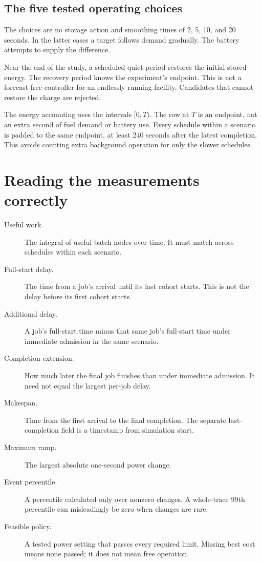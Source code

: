 \documentclass[11pt]{article}
\begin{document}
\subsection{The five tested operating choices}

The choices are no storage action and smoothing times of 2, 5, 10, and
20 seconds. In the latter cases a target follows demand gradually.
The battery attempts to supply the difference.

Near the end of the study, a scheduled quiet period restores the initial
stored energy. The recovery period knows the experiment's endpoint.
This is not a forecast-free controller for an endlessly running facility.
Candidates that cannot restore the charge are rejected.

The energy accounting uses the intervals $[0,T)$.
The row at $T$ is an endpoint, not an extra second of fuel demand or battery
use. Every schedule within a scenario is padded to the same endpoint,
at least 240 seconds after the latest completion. This avoids counting
extra background operation for only the slower schedules.

\section{Reading the measurements correctly}

\begin{description}
\item[Useful work.] The integral of useful batch nodes over time.
It must match across schedules within each scenario.
\item[Full-start delay.] The time from a job's arrival until its last cohort
starts. This is not the delay before its first cohort starts.
\item[Additional delay.] A job's full-start time minus that same job's
full-start time under immediate admission in the same scenario.
\item[Completion extension.] How much later the final job finishes than
under immediate admission. It need not equal the largest per-job delay.
\item[Makespan.] Time from the first arrival to the final completion.
The separate last-completion field is a timestamp from simulation start.
\item[Maximum ramp.] The largest absolute one-second power change.
\item[Event percentile.] A percentile calculated only over nonzero changes.
A whole-trace 99th percentile can misleadingly be zero when changes are rare.
\item[Feasible policy.] A tested power setting that passes every required
limit. Missing best cost means none passed; it does not mean free operation.
\end{description}
\end{document}
